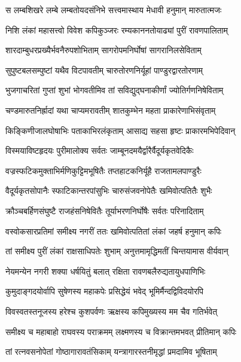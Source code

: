 
\twolineshloka
{स लम्बशिखरे लम्बे लम्बतोयदसंनिभे}
{सत्त्वमास्थाय मेधावी हनुमान् मारुतात्मजः} %

\twolineshloka
{निशि लंकां महासत्त्वो विवेश कपिकुञ्जरः}
{रम्यकाननतोयाढ्यां पुरीं रावणपालिताम्} %

\twolineshloka
{शारदाम्बुधरप्रख्यैर्भवनैरुपशोभिताम्}
{सागरोपमनिर्घोषां सागरानिलसेविताम्} %

\twolineshloka
{सुपुष्टबलसम्पुष्टां यथैव विटपावतीम्}
{चारुतोरणनिर्यूहां पाण्डुरद्वारतोरणाम्} %

\twolineshloka
{भुजगाचरितां गुप्तां शुभां भोगवतीमिव}
{तां सविद्युद्घनाकीर्णां ज्योतिर्गणनिषेविताम्} %

\twolineshloka
{चण्डमारुतनिर्ह्रादां यथा चाप्यमरावतीम्}
{शातकुम्भेन महता प्राकारेणाभिसंवृताम्} %

\twolineshloka
{किङ्किणीजालघोषाभिः पताकाभिरलंकृताम्}
{आसाद्य सहसा हृष्टः प्राकारमभिपेदिवान्} %

\twolineshloka
{विस्मयाविष्टहृदयः पुरीमालोक्य सर्वतः}
{जाम्बूनदमयैर्द्वारैर्वैदूर्यकृतवेदिकैः} %

\twolineshloka
{वज्रस्फटिकमुक्ताभिर्मणिकुट्टिमभूषितैः}
{तप्तहाटकनिर्यूहै राजतामलपाण्डुरैः} %

\twolineshloka
{वैदूर्यकृतसोपानैः स्फाटिकान्तरपांसुभिः}
{चारुसंजवनोपेतैः खमिवोत्पतितैः शुभैः} %

\twolineshloka
{क्रौञ्चबर्हिणसंघुष्टै राजहंसनिषेवितैः}
{तूर्याभरणनिर्घोषैः सर्वतः परिनादिताम्} %

\twolineshloka
{वस्वोकसारप्रतिमां समीक्ष्य नगरीं ततः}
{खमिवोत्पतितां लंकां जहर्ष हनुमान् कपिः} %

\twolineshloka
{तां समीक्ष्य पुरीं लंकां राक्षसाधिपतेः शुभाम्}
{अनुत्तमामृद्धिमतीं चिन्तयामास वीर्यवान्} %

\twolineshloka
{नेयमन्येन नगरी शक्या धर्षयितुं बलात्}
{रक्षिता रावणबलैरुद्यतायुधपाणिभिः} %

\twolineshloka
{कुमुदाङ्गदयोर्वापि सुषेणस्य महाकपेः}
{प्रसिद्धेयं भवेद् भूमिर्मैन्दद्विविदयोरपि} %

\twolineshloka
{विवस्वतस्तनूजस्य हरेश्च कुशपर्वणः}
{ऋक्षस्य कपिमुख्यस्य मम चैव गतिर्भवेत्} %

\twolineshloka
{समीक्ष्य च महाबाहो राघवस्य पराक्रमम्}
{लक्ष्मणस्य च विक्रान्तमभवत् प्रीतिमान् कपिः} %

\twolineshloka
{तां रत्नवसनोपेतां गोष्ठागारावतंसिकाम्}
{यन्त्रागारस्तनीमृद्धां प्रमदामिव भूषिताम्} %


